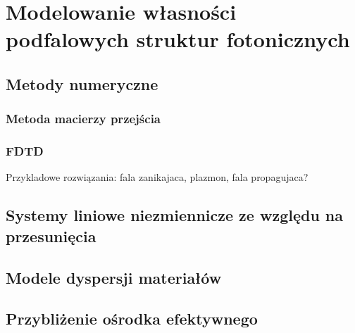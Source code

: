 \chapter{Modelowanie własności podfalowych struktur fotonicznych}
\section{Metody numeryczne}
\subsection{Metoda macierzy przejścia}

\subsection{FDTD}

Przykladowe rozwiązania: fala zanikajaca, plazmon, fala propagujaca?
\section{Systemy liniowe niezmiennicze ze względu na przesunięcia}

\section{Modele dyspersji materiałów}

\section{Przybliżenie ośrodka efektywnego}



